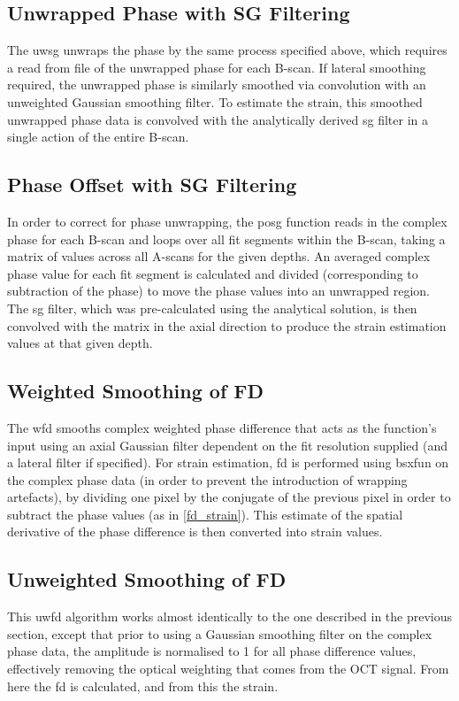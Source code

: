 \subsection{Unwrapped Phase with SG Filtering}
The \ac{uwsg} unwraps the phase by the same process specified above, which requires a read from file of the unwrapped phase for each B-scan. If lateral smoothing required, the unwrapped phase is similarly smoothed via convolution with an unweighted Gaussian smoothing filter. To estimate the strain, this smoothed unwrapped phase data is convolved with the analytically derived \ac{sg} filter in a single action of the entire B-scan.
   
\subsection{Phase Offset with SG Filtering}
In order to correct for phase unwrapping, the \ac{posg} function reads in the complex phase for each B-scan and loops over all fit segments within the B-scan, taking a matrix of values across all A-scans for the given depths. An averaged complex phase value for each fit segment is calculated and divided (corresponding to subtraction of the phase) to move the phase values into an unwrapped region. The \ac{sg} filter, which was pre-calculated using the analytical solution, is then convolved with the matrix in the axial direction to produce the strain estimation values at that given depth. 

\subsection{Weighted Smoothing of FD}
The \ac{wfd} smooths complex weighted phase difference that acts as the function's input using an axial Gaussian filter dependent on the fit resolution supplied (and a lateral filter if specified). For strain estimation, \ac{fd} is performed using bsxfun on the complex phase data (in order to prevent the introduction of  wrapping artefacts), by dividing one pixel by the conjugate of the previous pixel in order to subtract the phase values (as in \autoref{fd_strain}). This estimate of the spatial derivative of the phase difference is then converted into strain values.

\subsection{Unweighted Smoothing of FD}
This \ac{uwfd} algorithm works almost identically to the one described in the previous section, except that prior to using a Gaussian smoothing filter on the complex phase data, the amplitude is normalised to 1 for all phase difference values, effectively removing the optical weighting that comes from the OCT signal. From here the \ac{fd} is calculated, and from this the strain. 

